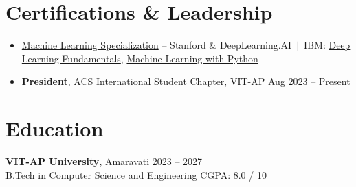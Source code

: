 \documentclass[a4paper,10pt]{article}
\begin{document}
\section{Certifications \& Leadership}
\begin{itemize}
  \item \href{https://drive.google.com/file/d/1bYBUAIvUOMfzw3lgQpruA0vFzStBH2Kx/view?usp=sharing}{Machine Learning Specialization} -- Stanford \& DeepLearning.AI \,$|$\, IBM: \href{https://courses.cognitiveclass.ai/certificates/b24fd91a07c14d8ba2b6dbf0d6a6c6c5}{Deep Learning Fundamentals}, \href{https://www.credly.com/badges/91a4bb99-9a17-4c7c-b000-3c7e54c148eb/print}{Machine Learning with Python}
  \item \textbf{President}, \href{https://acsvitap.in/}{ACS International Student Chapter}, VIT-AP \hfill Aug 2023 -- Present
\end{itemize}

\section{Education}
\textbf{VIT-AP University}, Amaravati \hfill 2023 -- 2027\\
B.Tech in Computer Science and Engineering \hfill CGPA: 8.0 / 10
\end{document}
